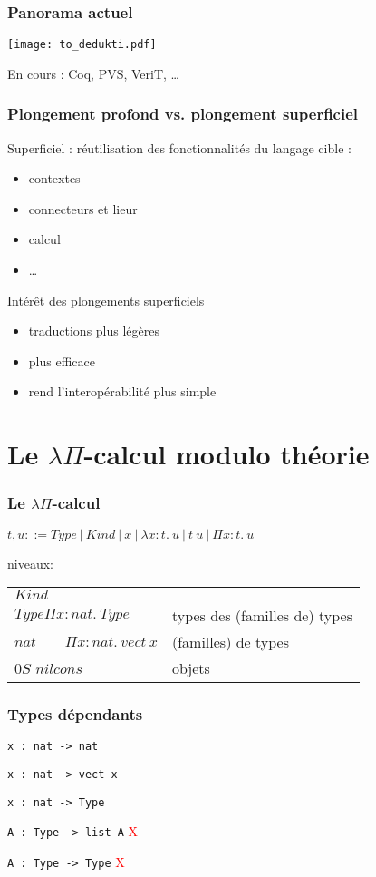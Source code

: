 \documentclass[12pt,aspectratio=169]{beamer}
\begin{document}
\begin{frame}
  \frametitle{Panorama actuel}
  \texttt{[image: to\_dedukti.pdf]}
  
  En cours : Coq, PVS, VeriT, \dots
\end{frame}

\begin{frame}
  \frametitle{Plongement profond vs. plongement superficiel}
  Superficiel : réutilisation des fonctionnalités du langage cible :
\begin{itemize}
\item contextes
\item connecteurs et lieur
\item calcul
\item \dots
\end{itemize}
\bigskip

Intérêt des plongements superficiels
\begin{itemize}
\item traductions plus légères
\item plus efficace
\item rend l'interopérabilité plus simple
\end{itemize}

\end{frame}

\section{Le $\lambda\Pi$-calcul modulo théorie}



\begin{frame}
  \frametitle{Le $\lambda\Pi$-calcul}
  $t,u ::= Type~|~Kind~|~x~|~\lambda x:t.~u~|~t~u~|~\Pi x:t.~u$
  \bigskip
  
  niveaux:
  \begin{tabular}[t]{ll}
    $Kind$\\
    $Type$\qquad $\Pi x:nat.~Type$&types des (familles de) types\\
    $nat\qquad \Pi x:nat.~vect~x$&(familles) de types\\
    0\qquad $S$ \qquad$nil$\qquad$cons$ & objets
  \end{tabular}
  
\end{frame}

\begin{frame}[fragile]
  \frametitle{Types dépendants}
 \lstinline!x : nat -> nat! \textcolor{green}{\checkmark}
 \medskip
 
 \lstinline!x : nat -> vect x! \textcolor{green}{\checkmark}
\medskip
 
 \lstinline!x : nat -> Type! \textcolor{green}{\checkmark}
\medskip
 
 \lstinline!A : Type -> list A! \textcolor{red}{X}
\medskip
 
 \lstinline!A : Type -> Type! \textcolor{red}{X}
\end{frame}
\end{document}
